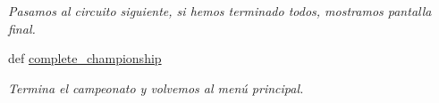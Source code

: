 \begin{DoxyCompactItemize}
\begin{DoxyCompactList}\small\item\em \-Pasamos al circuito siguiente, si hemos terminado todos, mostramos pantalla final. \end{DoxyCompactList}\item 
\hypertarget{classengine_1_1modes_1_1ChampionShip_a2b67a0f99facee9dca7075b3c5305e08}{
def \hyperlink{classengine_1_1modes_1_1ChampionShip_a2b67a0f99facee9dca7075b3c5305e08}{complete\-\_\-championship}}
\label{classengine_1_1modes_1_1ChampionShip_a2b67a0f99facee9dca7075b3c5305e08}

\begin{DoxyCompactList}\small\item\em \-Termina el campeonato y volvemos al menú principal. \end{DoxyCompactList}\end{DoxyCompactItemize}
